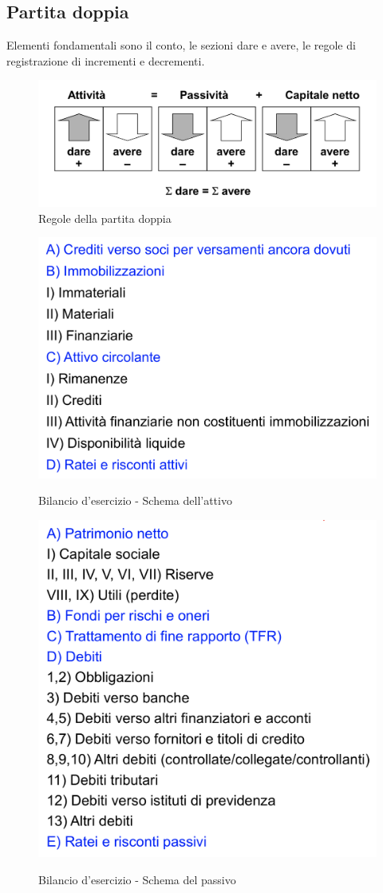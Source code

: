 \documentclass{report}
\begin{document}
	\subsection{Partita doppia}
	Elementi fondamentali sono il conto, le sezioni dare e avere, le regole di registrazione di incrementi e decrementi.
	\begin{figure}[h]
		\centering
		\includegraphics[width=0.7\linewidth]{partita-doppia}
		\caption{Regole della partita doppia}
		\label{fig:partita-doppia}
	\end{figure}
	\begin{figure}[H]
		\centering
		\caption{Bilancio d'esercizio - Schema dell'attivo}
		\includegraphics[width=0.7\linewidth]{schema-attivo}
		\label{fig:schema-attivo}
	\end{figure}
	\begin{figure}[H]
		\centering
		\caption{Bilancio d'esercizio - Schema del passivo}
		\includegraphics[width=0.7\linewidth]{schema-passivo}
		\label{fig:schema-passivo}
	\end{figure}
\end{document}
